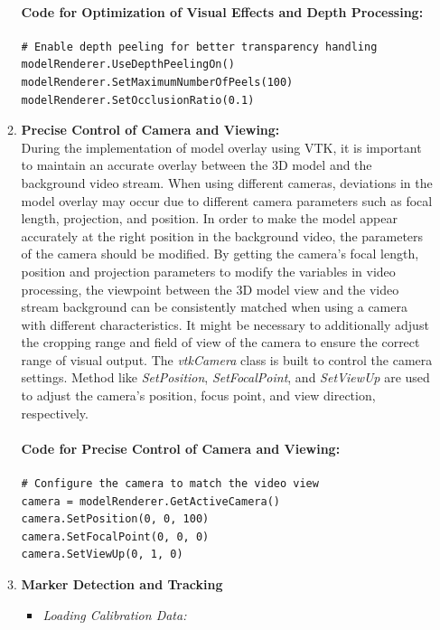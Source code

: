 \documentclass[12pt]{article}
\begin{document}
\begin{enumerate}
\begin{enumerate}
                        \paragraph{Code for Optimization of Visual Effects and Depth Processing:}
                        \begin{verbatim}
# Enable depth peeling for better transparency handling
modelRenderer.UseDepthPeelingOn()
modelRenderer.SetMaximumNumberOfPeels(100)
modelRenderer.SetOcclusionRatio(0.1)
                        \end{verbatim}
                  \item \textbf{Precise Control of Camera and Viewing:}
                        \\
                        During the implementation of model overlay using VTK, it is important to maintain an accurate overlay between the 3D model and the background video stream. When using different cameras, deviations in the model overlay may occur due to different camera parameters such as focal length, projection, and position. In order to make the model appear accurately at the right position in the background video, the parameters of the camera should be modified. By getting the camera's focal length, position and projection parameters to modify the variables in video processing, the viewpoint between the 3D model view and the video stream background can be consistently matched when using a camera with different characteristics. It might be necessary to additionally adjust the cropping range and field of view of the camera to ensure the correct range of visual output. The \emph{vtkCamera} class is built to control the camera settings. Method like \emph{SetPosition}, \emph{SetFocalPoint}, and \emph{SetViewUp} are used to adjust the camera's position, focus point, and view direction, respectively.\cite{vtk_examples_camera,vtk_camera_doc_2023}
                        \paragraph{Code for Precise Control of Camera and Viewing:}
                        \begin{verbatim}
# Configure the camera to match the video view
camera = modelRenderer.GetActiveCamera()
camera.SetPosition(0, 0, 100)
camera.SetFocalPoint(0, 0, 0)
camera.SetViewUp(0, 1, 0)
                        \end{verbatim}
                  \item \textbf{Marker Detection and Tracking}
                        \begin{itemize}
                              \item \textit{Loading Calibration Data:}


\end{itemize}
\end{enumerate}
\end{enumerate}
\end{document}
